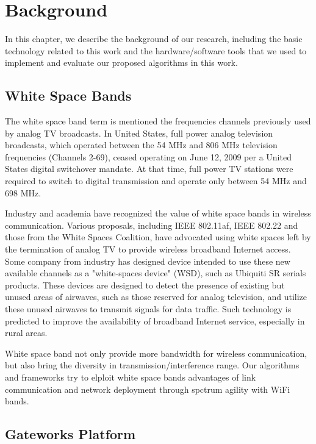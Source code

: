 \chapter{Background} \label{ch:background}

In this chapter, we describe the background of our research, 
including the basic technology related to this work and the 
hardware/software tools that we used to implement and evaluate 
our proposed algorithms in this work.


\section{White Space Bands}

The white space band term is mentioned the frequencies channels 
previously used by analog TV broadcasts. In United States, full 
power analog television broadcasts, which operated between the 
54 MHz and 806 MHz television frequencies (Channels 2-69), ceased 
operating on June 12, 2009 per a United States digital switchover 
mandate. At that time, full power TV stations were required to 
switch to digital transmission and operate only between 54 MHz 
and 698 MHz.~\cite{fccwhitespace} 

Industry and academia have recognized the value of white space 
bands in wireless communication. Various proposals, including 
IEEE 802.11af, IEEE 802.22 and those from the White Spaces 
Coalition, have advocated using white spaces left by the termination 
of analog TV to provide wireless broadband Internet access. Some 
company from industry has designed device intended to use these 
new available channels as a "white-spaces device" (WSD), such as 
Ubiquiti SR serials products. These devices are designed to detect 
the presence of existing but unused areas of airwaves, such as 
those reserved for analog television, and utilize these unused 
airwaves to transmit signals for data traffic. Such technology 
is predicted to improve the availability of broadband Internet 
service, especially in rural areas.

White space band not only provide more bandwidth for wireless 
communication, but also bring the diversity in transmission/interference 
range. Our algorithms and frameworks try to elploit white space bands 
advantages of link communication and network deployment through spctrum
agility with WiFi bands.


\section{Gateworks Platform}

